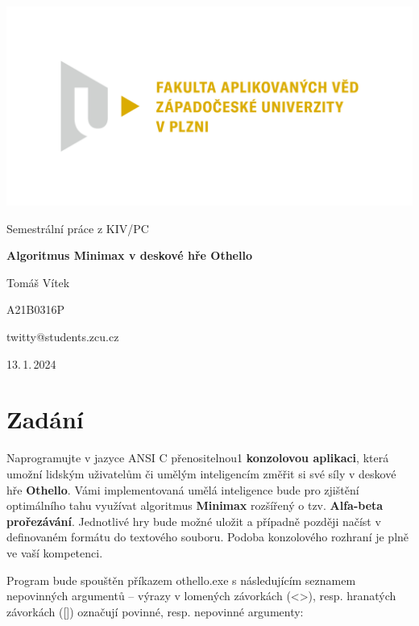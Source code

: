 \documentclass[
12pt,
a4paper,
pdftex,
czech,
titlepage
]{report}
\begin{document}
\begin{titlepage}
	\vspace*{-2cm}
	{\centering\includegraphics[scale=1.0]{logo.png}\par}
	\centering
	\vspace*{2cm}
	{\Large Semestrální práce z KIV/PC\par}
	\vspace{1.5cm}
	{\Huge\bfseries Algoritmus Minimax v deskové hře Othello\par}
	\vspace{2cm}

	{\Large Tomáš Vítek\par}
	{\Large A21B0316P\par}
	{\Large twitty@students.zcu.cz\par}

	\vfill

	{\Large 13.\,1.\,2024}
\end{titlepage}

\tableofcontents
\thispagestyle{empty}
\clearpage

\chapter{Zadání}
\setcounter{page}{1}
Naprogramujte v jazyce ANSI C přenositelnou1 \textbf{konzolovou aplikaci}, která umožní lidským
uživatelům či umělým inteligencím změřit si své síly v deskové hře \textbf{Othello}. Vámi implementovaná umělá inteligence bude pro zjištění optimálního
tahu využívat algoritmus \textbf{Minimax} rozšířený o tzv. \textbf{Alfa-beta prořezávání}. Jednotlivé hry bude
možné uložit a případně později načíst v definovaném formátu do textového souboru. Podoba
konzolového rozhraní je plně ve vaší kompetenci.

Program bude spouštěn příkazem othello.exe
s následujícím seznamem nepovinných argumentů
– výrazy v lomených závorkách (<>), resp. hranatých závorkách ([]) označují povinné, resp. nepovinné argumenty:
\end{document}
